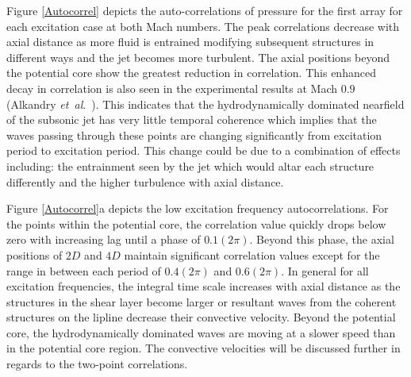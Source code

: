 \documentclass[english]{aiaa-tc}
\newcommand*{\etal}{\textit{et~al}.\ }
\begin{document}
Figure \ref{Autocorrel} depicts the auto-correlations of pressure for the first array for each excitation case at both Mach numbers. The peak correlations decrease with axial distance as more fluid is entrained modifying subsequent structures in different ways and the jet becomes more turbulent. The axial positions beyond the potential core show the greatest reduction in correlation. This enhanced decay in correlation is also seen in the experimental results at Mach $0.9$ (Alkandry \etal \cite{Alkandry2013}). This indicates that the hydrodynamically dominated nearfield of the subsonic jet has very little temporal coherence which implies that the waves passing through these points are changing significantly from excitation period to excitation period. This change could be due to a combination of effects including: the entrainment seen by the jet which would altar each structure differently and the higher turbulence with axial distance.

Figure \ref{Autocorrel}a depicts the low excitation frequency autocorrelations. For the points within the potential core, the correlation value quickly drops below zero with increasing lag until a phase of $0.1(2\pi)$. Beyond this phase, the axial positions of $2D$ and $4D$ maintain significant correlation values except for the range in between each period of $0.4(2\pi)$ and $0.6(2\pi)$. In general for all excitation frequencies, the integral time scale increases with axial distance as the structures in the shear layer become larger  or resultant waves from the coherent structures on the lipline decrease their convective velocity. Beyond the potential core, the hydrodynamically dominated waves are moving at a slower speed than in the potential core region. The convective velocities will be discussed further in regards to the two-point correlations. 
\end{document}
